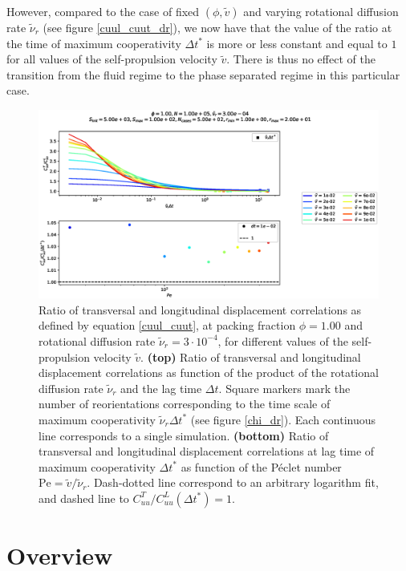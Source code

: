 \documentclass[class=report, float=false, crop=false]{standalone}
\begin{document}
However, compared to the case of fixed $(\phi, \tilde{v})$ and varying rotational diffusion rate $\tilde{\nu}_r$ (see figure \ref{cuul_cuut_dr}), we now have that the value of the ratio at the time of maximum cooperativity $\Delta t^*$ is more or less constant and equal to $1$ for all values of the self-propulsion velocity $\tilde{v}$. There is thus no effect of the transition from the fluid regime to the phase separated regime in this particular case.

\begin{figure}[h!]
\centering
\includegraphics[width=\textwidth]{figures/figs/CuuLCuuT_Dl1000_Rh3000_Nq1000_Io5000_Mn1000_Cn5000.eps}
\caption{Ratio of transversal and longitudinal displacement correlations as defined by equation \ref{cuul_cuut}, at packing fraction $\phi=1.00$ and rotational diffusion rate $\tilde{\nu}_r=3\cdot10^{-4}$, for different values of the self-propulsion velocity $\tilde{v}$. \textbf{(top)} Ratio of transversal and longitudinal displacement correlations as function of the product of the rotational diffusion rate $\tilde{\nu}_r$ and the lag time $\Delta t$. Square markers mark the number of reorientations corresponding to the time scale of maximum cooperativity $\tilde{\nu}_r \Delta t^*$ (see figure \ref{chi_dr}). Each continuous line corresponds to a single simulation. \textbf{(bottom)} Ratio of transversal and longitudinal displacement correlations at lag time of maximum cooperativity $\Delta t^*$ as function of the P\'eclet number $\text{Pe}=\tilde{v}/\tilde{\nu}_r$. Dash-dotted line correspond to an arbitrary logarithm fit, and dashed line to $C_{uu}^T/C_{uu}^L(\Delta t^*) = 1$.}
\label{cuul_cuut_v}
\end{figure}

\newpage
\section{Overview}
\end{document}
